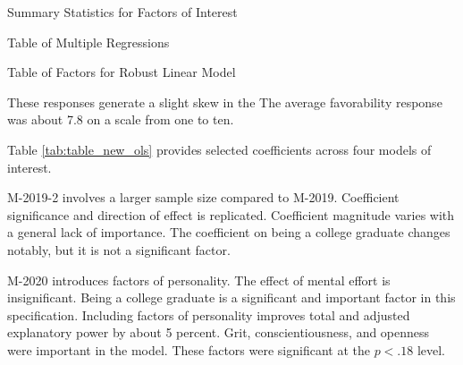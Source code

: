 \documentclass[review]{elsarticle}
\begin{document}
\begin{table}
    \caption{Summary Statistics for Factors of Interest}
    \resizebox{\columnwidth}{!}{
        
    }
    \label{tab:desc_stats}
\end{table}



    \begin{table}
        \caption{Table of Multiple Regressions}
        \resizebox{\columnwidth}{!}{
            
        }
        \label{tab:table_new_ols}
    \end{table}
    
    \begin{table}
        \caption{Table of Factors for Robust Linear Model}
        \resizebox{\columnwidth}{!}{
            
        }
        \label{tab:table_robust_reg}
    \end{table}



These responses generate a slight skew in the
The average favorability response was about 7.8 on a scale from one to ten.


Table \ref{tab:table_new_ols} provides selected coefficients across four models of interest.

M-2019-2 involves a larger sample size compared to M-2019.
Coefficient significance and direction of effect is replicated.
Coefficient magnitude varies with a general lack of importance.
The coefficient on being a college graduate changes notably, but it is not a significant factor.

M-2020 introduces factors of personality.
The effect of mental effort is insignificant.
Being a college graduate is a significant and important factor in this specification.
Including factors of personality improves total and adjusted explanatory power by about 5 percent.
Grit, conscientiousness, and openness were important in the model.
These factors were significant at the $p<.18$ level.
\end{document}
